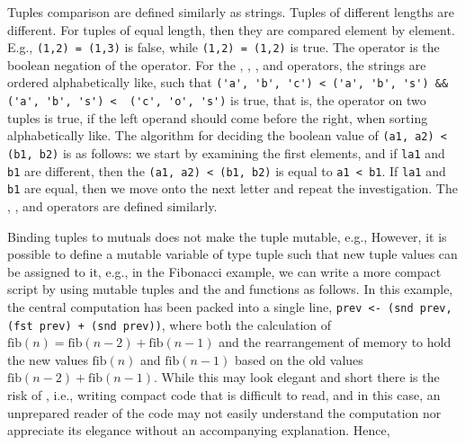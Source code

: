 Tuples comparison are defined similarly as strings. Tuples of different lengths are different. For tuples of equal length, then they are compared element by element. E.g., \lstinline!(1,2) = (1,3)! is false, while \lstinline!(1,2) = (1,2)! is true. The \lexeme{<>} operator is the boolean negation of the \lexeme{=} operator. For the \lexeme{<} , \lexeme{<=}, \lexeme{>}, and \lexeme{>=} operators, the strings are ordered alphabetically like, such that \lstinline!('a', 'b', 'c') < ('a', 'b', 's') && ('a', 'b', 's') <  ('c', 'o', 's')! is true, that is, the \lexeme{<} operator on two tuples is true, if the left operand should come before the right, when sorting alphabetically like. 
%
%
The algorithm for deciding the boolean value of \lstinline!(a1, a2) < (b1, b2)! is as follows: we start by examining the first elements, and if \lstinline!la1! and \lstinline!b1! are different, then the \lstinline!(a1, a2) < (b1, b2)! is equal to \lstinline!a1 < b1!. If \lstinline!la1! and \lstinline!b1! are equal, then we move onto the next letter and repeat the investigation. The \lexeme{<=}, \lexeme{>}, and \lexeme{>=} operators are defined similarly.

Binding tuples to mutuals does not make the tuple mutable, e.g.,
%
%
However, it is possible to define a mutable variable of type tuple such that new tuple values can be assigned to it, e.g., in the Fibonacci example, we can write a more compact script by using mutable tuples and the  and  functions as follows.
%
%
In this example, the central computation has been packed into a single line, \lstinline!prev <- (snd prev, (fst prev) + (snd prev))!, where both the calculation of $\text{fib}(n) = \text{fib}(n-2) + \text{fib}(n-1)$ and the rearrangement of memory to hold the new values $\text{fib}(n)$ and $\text{fib}(n-1)$ based on the old values $\text{fib}(n-2) + \text{fib}(n-1)$. While this may look elegant and short there is the risk of , i.e., writing compact code that is difficult to read, and in this case, an unprepared reader of the code may not easily understand the computation nor appreciate its elegance without an accompanying explanation.  Hence, 

